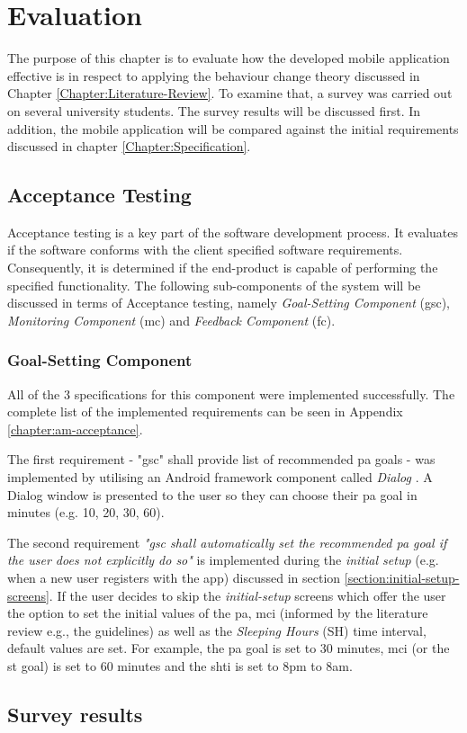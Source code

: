 \chapter{Evaluation}
The purpose of this chapter is to evaluate how the developed mobile application effective is in respect to applying the behaviour change theory discussed in Chapter \ref{Chapter:Literature-Review}. To examine that, a survey was carried out on several university students. The survey results will be discussed first. In addition, the mobile application will be compared against the initial requirements discussed in chapter  \ref{Chapter:Specification}.

\section{Acceptance Testing}
Acceptance testing is a key part of the software development process. It evaluates if the software conforms with the client specified software requirements. Consequently, it is determined if the end-product is capable of performing the specified functionality. The following sub-components of the system will be discussed in terms of Acceptance testing, namely \textit{Goal-Setting Component} (\gls{gsc}), \textit{Monitoring Component} (\gls{mc}) and \textit{Feedback Component} (\gls{fc}).

\subsection{Goal-Setting Component}
All of the 3 specifications for this component were implemented successfully. The complete list of the implemented requirements can be seen in Appendix \ref{chapter:am-acceptance}.

The first requirement - "\gls{gsc}" shall provide list of recommended \gls{pa} goals - was implemented by utilising an Android framework component called \textit{Dialog} \citep{androiddialogs_2017}. A Dialog window is presented to the user so they can choose their \gls{pa} goal in minutes (e.g. 10, 20, 30, 60).

The second requirement \textit{"\gls{gsc} shall automatically set the recommended \gls{pa} goal if the user does not explicitly do so"} is implemented during the \textit{initial setup} (e.g. when a new user registers with the app) discussed in section \ref{section:initial-setup-screens}. If the user decides to skip the \textit{initial-setup} screens which offer the user the option to set the initial values of the \gls{pa}, \gls{mci} (informed by the literature review e.g., the guidelines) as well as the \textit{Sleeping Hours} (SH) time interval, default values are set. For example, the \gls{pa} goal is set to 30 minutes, \gls{mci} (or the \gls{st} goal) is set to 60 minutes and the \gls{shti} is set to 8pm to 8am.

\section{Survey results}

